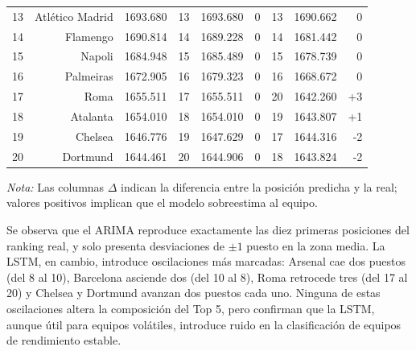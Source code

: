 \begin{table}[htbp]
{\begin{tabular}{crrrcrrcr}
			13 & Atl\'etico Madrid & 1693.680 & 13 & 1693.680 &  0 & 13 & 1690.662 &  0 \\
			14 & Flamengo     & 1690.814 & 14 & 1689.228 &  0 & 14 & 1681.442 &  0 \\
			15 & Napoli       & 1684.948 & 15 & 1685.489 &  0 & 15 & 1678.739 &  0 \\
			16 & Palmeiras    & 1672.905 & 16 & 1679.323 &  0 & 16 & 1668.672 &  0 \\
			17 & Roma         & 1655.511 & 17 & 1655.511 &  0 & 20 & 1642.260 & +3 \\
			18 & Atalanta     & 1654.010 & 18 & 1654.010 &  0 & 19 & 1643.807 & +1 \\
			19 & Chelsea      & 1646.776 & 19 & 1647.629 &  0 & 17 & 1644.316 & -2 \\
			20 & Dortmund     & 1644.461 & 20 & 1644.906 &  0 & 18 & 1643.824 & -2 \\
			\bottomrule
	\end{tabular}}%
	\newline 
	{\small \textit{Nota:} Las columnas \(\Delta\) indican la diferencia entre la posici\'on predicha y la real; valores positivos implican que el modelo sobreestima al equipo.}
\end{table}

Se observa que el ARIMA reproduce exactamente las diez primeras posiciones del ranking real, y solo presenta desviaciones de $\pm 1$ puesto en la zona media. La LSTM, en cambio, introduce oscilaciones m\'as marcadas: Arsenal cae dos puestos (del 8 al 10), Barcelona asciende dos (del 10 al 8), Roma retrocede tres (del 17 al 20) y Chelsea y Dortmund avanzan dos puestos cada uno. Ninguna de estas oscilaciones altera la composici\'on del Top 5, pero confirman que la LSTM, aunque \'util para equipos vol\'atiles, introduce ruido en la clasificaci\'on de equipos de rendimiento estable.

\newpage

